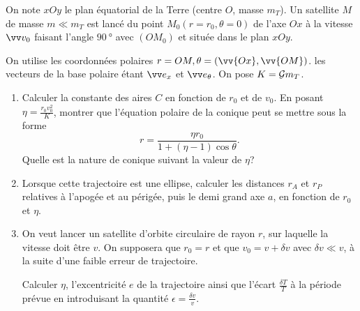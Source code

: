 \begin{exercice}%
  On note \(xOy\) le plan équatorial de la Terre (centre \(O\), masse \(m_T\)).
  Un satellite \(M\) de masse \(m \ll m_T\) est lancé du point \(M_0(r=r_0, 
  \theta=0)\) de l'axe \(Ox\) à la vitesse \(\vvv_0\) faisant l'angle 
  \(\SI{90}{\degree}\) avec \((OM_0)\) et située dans le plan \(xOy\).

  On utilise les coordonnées polaires \(r=OM, \theta = (\vv{Ox}, \vv{OM})\). 
  les vecteurs de la base polaire étant \(\ex\) et \(\etheta\). On pose \(K = 
  \mathcal{G} m_T\).
  \begin{enumerate}%
    \item Calculer la constante des aires \(C\) en fonction de \(r_0\) et de 
      \(v_0\). En posant \(\eta = \frac{r_0 v_0^{2}}{K}\), montrer que 
      l'équation polaire de la conique peut se mettre sous la forme \[r = 
      \frac{\eta r_0}{1 + (\eta-1)\cos\theta}.\] Quelle est la nature de 
      conique suivant la valeur de \(\eta\)?
    \item Lorsque cette trajectoire est une ellipse, calculer les distances 
      \(r_A\) et \(r_P\) relatives à l'apogée et au périgée, puis le demi grand
      axe \(a\), en fonction de \(r_0\) et \(\eta\).
    \item On veut lancer un satellite d'orbite circulaire de rayon \(r\), sur 
      laquelle la vitesse doit être \(v\). On supposera que \(r_0 = r\) et que
      \(v_0 = v + \delta v\) avec \(\delta v \ll v\), à la suite d'une faible 
      erreur de trajectoire.

      Calculer \(\eta\), l'excentricité \(e\) de la trajectoire ainsi que 
      l'écart \(\frac{\delta T}{T}\) à la période prévue en introduisant la 
      quantité \(\epsilon = \frac{\delta v}{v}\).
  \end{enumerate}%
\end{exercice}%
